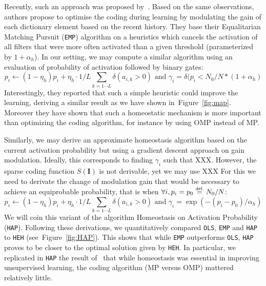 \documentclass[a4paper, 11pt, draft]{article} %
\newcommand{\image}{\mathbf{I}} %
\newcommand{\eqdef}{\ensuremath{\stackrel{\mbox{\upshape\tiny def.}}{=}}}
\newcommand{\seeFig}[1]{Figure~\ref{fig:#1}}%
\begin{document}
Recently, such an approach was proposed by~\citet{Sandin17}. Based on the same observations, authors propose to optimise the coding during learning by modulating the gain of each dictionary element based on the recent history. They base their Equalitarian Matching Pursuit (\texttt{EMP}) algorithm on a heuristics which cancels the activation of all filters that were more often activated than a given threshold (parameterized by $1+\alpha_h$). In our setting, we may compute a similar algorithm using an evaluation of probability of activation followed by binary gates:
\begin{equation}%
p_i \leftarrow (1- \eta_h ) p_i + \eta_h \cdot 1/L\sum_{k=1\cdots L} \delta(a_{i, k} > 0) \textrm{ and }
\gamma_i = \delta (p_i < N_0/N*(1+\alpha_h)
\end{equation}%
Interestingly, they reported that such a simple heuristic could improve the learning, deriving a similar result as we have shown in~\seeFig{map}. Moreover they have shown that such a homeostatic mechanism is more important than optimizing the coding algorithm, for instance by using OMP instead of MP.

Similarly, we may derive an approximate homeostasis algorithm based on the current activation probability but using a gradient descent approach on gain modulation. Ideally, this corresponds to finding $\gamma_i$ such that XXX. However, the sparse coding function $S(\image)$ is not derivable, yet we may use XXX
For this we need to derivate the change of modulation gain that would be necessary to achieve an equiprobable probability, that is when $\forall i, p_i = p_0 \eqdef N_0 / N$: %
\begin{equation}%
p_i \leftarrow (1- \eta_h ) p_i + \eta_h \cdot 1/L\sum_{k=1\cdots L} \delta(a_{i, k} > 0) \textrm{ and }
\gamma_i = \exp(-(p_i - p_0) / \alpha_h)
\end{equation}%
We will coin this variant of the algorithm Homeostasis on Activation Probability (\texttt{HAP}). %
Following these derivations, we quantitatively compared \texttt{OLS}, \texttt{EMP} and \texttt{HAP} to \texttt{HEH} (see~\seeFig{HAP}). This shows that while \texttt{EMP} outperforms \texttt{OLS}, \texttt{HAP} proves to be closer to the optimal solution given by \texttt{HEH}.
In particular, we replicated in \texttt{HAP} the result of~\citet{Sandin17} that while homeostasis was essential in improving unsupervised learning, the coding algorithm (MP versus OMP) mattered relatively little.
\end{document}
